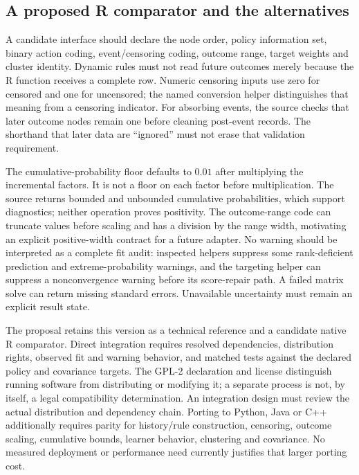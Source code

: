 \subsection{A proposed R comparator and the alternatives}

A candidate interface should declare the node order, policy information set,
binary action coding, event/censoring coding, outcome range, target weights
and cluster identity. Dynamic rules must not read future outcomes merely
because the R function receives a complete row. Numeric censoring inputs
use zero for censored and one for uncensored; the named conversion helper
distinguishes that meaning from a censoring indicator. For absorbing events,
the source checks that later outcome nodes remain one before cleaning
post-event records. The shorthand that later data are ``ignored'' must not
erase that validation requirement.~\citep{exec23_ltmle_source}

The cumulative-probability floor defaults to $0.01$ after multiplying the
incremental factors. It is not a floor on each factor before multiplication.
The source returns bounded and unbounded cumulative probabilities, which
support diagnostics; neither operation proves positivity. The outcome-range
code can truncate values before scaling and has a division by the range
width, motivating an explicit positive-width contract for a future adapter.
No warning should be interpreted as a complete fit audit: inspected helpers
suppress some rank-deficient prediction and extreme-probability warnings,
and the targeting helper can suppress a nonconvergence warning before its
score-repair path. A failed matrix solve can return missing standard errors.
Unavailable uncertainty must remain an explicit result state.
\citep{exec23_ltmle_source}

The proposal retains this version as a technical reference and a candidate
native R comparator. Direct integration requires resolved dependencies,
distribution rights, observed fit and warning behavior, and matched tests
against the declared policy and covariance targets. The GPL-2 declaration
and license distinguish running software from distributing or modifying it;
a separate process is not, by itself, a legal compatibility determination.
An integration design must review the actual distribution and dependency
chain. Porting to Python, Java or C++ additionally requires parity for
history/rule construction, censoring, outcome scaling, cumulative bounds,
learner behavior, clustering and covariance. No measured deployment or
performance need currently justifies that larger porting cost.
\citep{exec23_ltmle_source}


